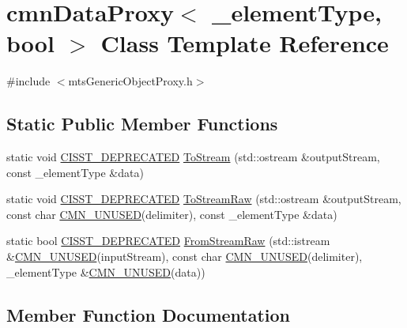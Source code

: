 \hypertarget{classcmn_data_proxy}{}\section{cmn\+Data\+Proxy$<$ \+\_\+element\+Type, bool $>$ Class Template Reference}
\label{classcmn_data_proxy}


{\ttfamily \#include $<$mts\+Generic\+Object\+Proxy.\+h$>$}

\subsection*{Static Public Member Functions}
\begin{DoxyCompactItemize}
\item 
static void \hyperlink{cmn_portability_8h_a63da7164735f9501be651b1f2bbc0121}{C\+I\+S\+S\+T\+\_\+\+D\+E\+P\+R\+E\+C\+A\+T\+E\+D} \hyperlink{classcmn_data_proxy_aeadcddf8cf3bd2538bfef85586879287}{To\+Stream} (std\+::ostream \&output\+Stream, const \+\_\+element\+Type \&data)
\item 
static void \hyperlink{cmn_portability_8h_a63da7164735f9501be651b1f2bbc0121}{C\+I\+S\+S\+T\+\_\+\+D\+E\+P\+R\+E\+C\+A\+T\+E\+D} \hyperlink{classcmn_data_proxy_aefc4e2285d0128285fa441addbb9ed3c}{To\+Stream\+Raw} (std\+::ostream \&output\+Stream, const char \hyperlink{cmn_portability_8h_a021894e2626935fa2305434b1e893ff6}{C\+M\+N\+\_\+\+U\+N\+U\+S\+E\+D}(delimiter), const \+\_\+element\+Type \&data)
\item 
static bool \hyperlink{cmn_portability_8h_a63da7164735f9501be651b1f2bbc0121}{C\+I\+S\+S\+T\+\_\+\+D\+E\+P\+R\+E\+C\+A\+T\+E\+D} \hyperlink{classcmn_data_proxy_ab073d3697f2844e96abc255813e86c61}{From\+Stream\+Raw} (std\+::istream \&\hyperlink{cmn_portability_8h_a021894e2626935fa2305434b1e893ff6}{C\+M\+N\+\_\+\+U\+N\+U\+S\+E\+D}(input\+Stream), const char \hyperlink{cmn_portability_8h_a021894e2626935fa2305434b1e893ff6}{C\+M\+N\+\_\+\+U\+N\+U\+S\+E\+D}(delimiter), \+\_\+element\+Type \&\hyperlink{cmn_portability_8h_a021894e2626935fa2305434b1e893ff6}{C\+M\+N\+\_\+\+U\+N\+U\+S\+E\+D}(data))
\end{DoxyCompactItemize}


\subsection{Member Function Documentation}
\hypertarget{classcmn_data_proxy_ab073d3697f2844e96abc255813e86c61}{}
